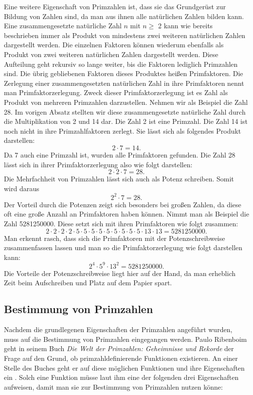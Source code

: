 Eine weitere Eigenschaft von Primzahlen ist, dass sie das Grundgerüst zur Bildung von Zahlen sind, da man aus ihnen alle natürlichen Zahlen bilden kann. Eine zusammengesetzte natürliche Zahl $n$ mit $n \geq$ 2 kann wie bereits beschrieben immer als Produkt von mindestens zwei weiteren natürlichen Zahlen dargestellt werden. Die einzelnen Faktoren können wiederum ebenfalls als Produkt von zwei weiteren natürlichen Zahlen dargestellt werden. Diese Aufteilung geht rekursiv so lange weiter, bis die Faktoren lediglich Primzahlen sind. Die übrig gebliebenen Faktoren dieses Produktes heißen Primfaktoren. Die Zerlegung einer zusammengesetzten natürlichen Zahl in ihre Primfaktoren nennt man Primfaktorzerlegung. Zweck dieser Primfaktorzerlegung ist es Zahl als Produkt von mehreren Primzahlen darzustellen. Nehmen wir als Beispiel die Zahl 28. Im vorigen Absatz stellten wir diese zusammengesetzte natürliche Zahl durch die Multiplikation von 2 und 14 dar. Die Zahl 2 ist eine Primzahl. Die Zahl 14 ist noch nicht in ihre Primzahlfaktoren zerlegt. Sie lässt sich als folgendes Produkt darstellen: \[2 \cdot 7=14.\] Da 7 auch eine Primzahl ist, wurden alle Primfaktoren gefunden. Die Zahl 28 lässt sich in ihrer Primfaktorzerlegung also wie folgt darstellen: \[2 \cdot 2 \cdot 7=28.\] Die Mehrfachheit von Primzahlen lässt sich auch als Potenz schreiben. Somit wird daraus \[2^{2} \cdot 7=28.\] Der Vorteil durch die Potenzen zeigt sich besonders bei großen Zahlen, da diese oft eine große Anzahl an Primfaktoren haben können. Nimmt man als Beispiel die Zahl 5281250000. Diese setzt sich mit ihren Primfaktoren wie folgt zusammen: \[2 \cdot 2 \cdot 2 \cdot 2 \cdot 5 \cdot 5 \cdot 5 \cdot 5 \cdot 5 \cdot 5 \cdot 5 \cdot 5 \cdot 5 \cdot 13 \cdot 13=5281250000.\] Man erkennt rasch, dass sich die Primfaktoren mit der Potenzschreibweise zusammenfassen lassen und man so die Primfaktorzerlegung wie folgt darstellen kann: \[2^{4} \cdot 5^{9} \cdot 13^{2}=5281250000.\] Die Vorteile der Potenzschreibweise liegt hier auf der Hand, da man erheblich Zeit beim Aufschreiben und Platz auf dem Papier spart.

\subsection{Bestimmung von Primzahlen}\label{sec:bestimmung_primzahlen}
Nachdem die grundlegenen Eigenschaften der Primzahlen angeführt wurden, muss auf die Bestimmung von Primzahlen eingegangen werden. Paulo Ribenboim geht in seinem Buch \textit{Die Welt der Primzahlen: Geheimnisse und Rekorde} der Frage auf den Grund, ob primzahldefinierende Funktionen existieren. An einer Stelle des Buches geht er auf diese möglichen Funktionen und ihre Eigenschaften ein \cite[S. 137]{Ribenboim.2011}. Solch eine Funktion müsse laut ihm eine der folgenden drei Eigenschaften aufweisen, damit man sie zur Bestimmung von Primzahlen nutzen könne:


